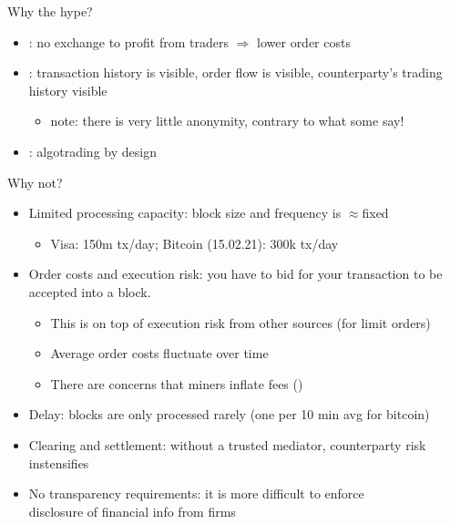 \documentclass[english,10pt
,aspectratio=169
]{beamer}
\begin{document}
\begin{frame}{Why the hype?}
	\begin{itemize}
		\item {}: no exchange to profit from traders $\Rightarrow$ lower order costs
		\item {}: transaction history is visible, order flow is visible, counterparty's trading history visible
		\begin{itemize}
			\item note: there is very little anonymity, contrary to what some say!
		\end{itemize}
		\item {}: algotrading by design
	\end{itemize}
\end{frame}


\begin{frame}[label=problems]{Why not?}
	\begin{itemize}
		\item \alert{Limited processing capacity}: block size and frequency is $\approx$fixed
		\begin{itemize}
			\item Visa: 150m tx/day; Bitcoin (15.02.21): 300k tx/day
		\end{itemize}
		\item \alert{Order costs} and \alert{execution risk}: you have to bid for your transaction to be accepted into a block.
		\begin{itemize}
			\item This is on top of execution risk from other sources (for limit orders)
			\item Average order costs fluctuate over time \hyperlink{bcfee}{}
			\item There are concerns that miners inflate fees (\cite{lehar_miner_2020})
		\end{itemize}
		\item \alert{Delay}: blocks are only processed rarely (one per 10 min avg for bitcoin) \hyperlink{blocktime}{}
		\item \alert{Clearing and settlement}: without a trusted mediator, counterparty risk instensifies
		\item \alert{No transparency requirements}: it is more difficult to enforce \\ disclosure of financial info from firms
	\end{itemize}
\end{frame}
\end{document}
